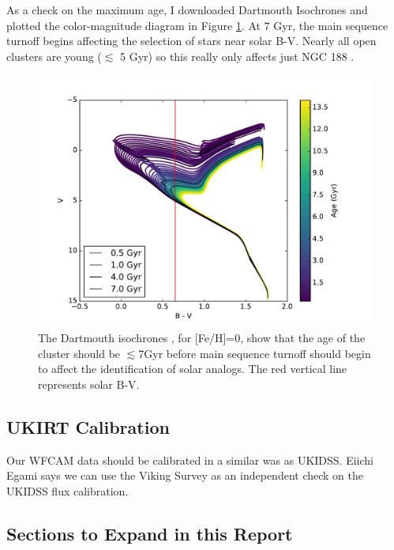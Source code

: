 \documentclass{aastex6}
\begin{document}
As a check on the maximum age, I downloaded Dartmouth Isochrones \citep{dotter2008dartmouth} and plotted the color-magnitude diagram in Figure \ref{fig:isochrones}.
At 7 Gyr, the main sequence turnoff begins affecting the selection of stars near solar B-V.
Nearly all open clusters are young ($\lesssim$ 5 Gyr) so this really only affects just NGC 188 \citep[7.1 Gyr][]{elsanhoury2016ngc188}.

\begin{figure}[!hbtp]
\centering
\includegraphics[width=.7\columnwidth]{hr_isochrones.pdf}
\caption{The Dartmouth isochrones \citep{dotter2008dartmouth}, for [Fe/H]=0, show that the age of the cluster should be $\lesssim 7 $Gyr before main sequence turnoff should begin to affect the identification of solar analogs.
The red vertical line represents solar B-V.}\label{fig:isochrones}
\end{figure}

\subsection{UKIRT Calibration}

Our WFCAM data should be calibrated in a similar was as UKIDSS.
Eiichi Egami says we can use the Viking Survey as an independent check on the UKIDSS flux calibration.

\subsection{Sections to Expand in this Report}
\end{document}
